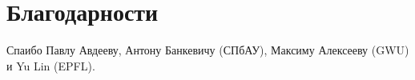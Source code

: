 \thispagestyle{empty}
\setcounter{page}{1}

\section*{Благодарности}
\noindent

Спаибо Павлу Авдееву, Антону Банкевичу (СПбАУ), Максиму Алексееву (GWU) и Yu Lin (EPFL).

\pagebreak
